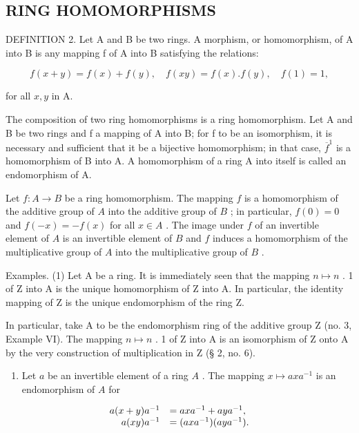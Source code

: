 \subsection{RING HOMOMORPHISMS}

DEFINITION 2. Let A and B be two rings. A morphism, or homomorphism, of A into B is any mapping f of A into B satisfying the relations:

\[
f (x + y) = f (x) + f (y), \quad f (x y) = f (x). f (y), \quad f (1) = 1,\tag{17}
\]

for all \(x, y\) in A.

The composition of two ring homomorphisms is a ring homomorphism. Let A and B be two rings and f a mapping of A into B; for f to be an isomorphism, it is necessary and sufficient that it be a bijective homomorphism; in that case, \(\overline{f}^{1}\) is a homomorphism of B into A. A homomorphism of a ring A into itself is called an endomorphism of A.

Let \(f: A \to B\) be a ring homomorphism. The mapping \(f\) is a homomorphism of the additive group of \(A\) into the additive group of \(B\) ; in particular, \(f(0) = 0\) and \(f(-x) = -f(x)\) for all \(x \in A\) . The image under \(f\) of an invertible element of \(A\) is an invertible element of \(B\) and \(f\) induces a homomorphism of the multiplicative group of \(A\) into the multiplicative group of \(B\) .

Examples. (1) Let A be a ring. It is immediately seen that the mapping \(n \mapsto n\) . 1 of Z into A is the unique homomorphism of Z into A. In particular, the identity mapping of Z is the unique endomorphism of the ring Z.

In particular, take A to be the endomorphism ring of the additive group Z (no. 3, Example VI). The mapping \(n \mapsto n\) . 1 of Z into A is an isomorphism of Z onto A by the very construction of multiplication in Z (§ 2, no. 6).

\begin{enumerate}
\def\labelenumi{(\arabic{enumi})}
\setcounter{enumi}{1}
\tightlist
\item
  Let \(a\) be an invertible element of a ring \(A\) . The mapping \(x \mapsto axa^{-1}\) is an endomorphism of \(A\) for
\end{enumerate}

\[
\begin{array}{r l} a (x + y) a ^ {- 1} & = a x a ^ {- 1} + a y a ^ {- 1}, \\ a (x y) a ^ {- 1} & = (a x a ^ {- 1}) (a y a ^ {- 1}). \end{array}
\]

